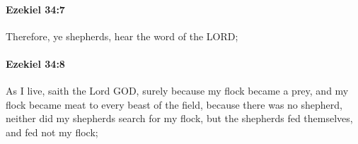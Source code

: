 		\paragraph{Ezekiel 34:7} %
			\label{EZEKIEL-34-7}

			Therefore, ye shepherds, hear the word of the LORD;


		\paragraph{Ezekiel 34:8} %
			\label{EZEKIEL-34-8}

			As I live, saith the Lord GOD, surely because my flock became a prey, and my flock became meat to every beast of the field, because there was no shepherd, neither did my shepherds search for my flock, but the shepherds fed themselves, and fed not my flock;


